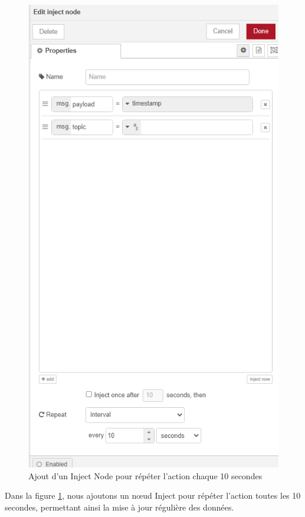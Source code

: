 \begin{figure}[H]
\centering
\includegraphics[width=12cm]{Images/Node-8.png}
\caption{Ajout d'un Inject Node pour répéter l'action chaque 10 secondes}
\label{Chap4.3.15}
\end{figure}

Dans la figure \ref{Chap4.3.15}, nous ajoutons un nœud Inject pour répéter l'action toutes les 10 secondes, permettant ainsi la mise à jour régulière des données.

